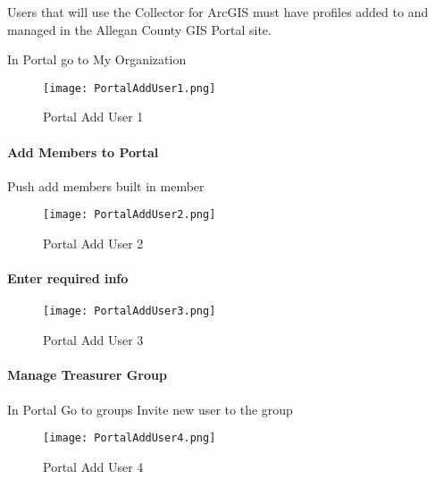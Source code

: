 \noindent Users that will use the Collector for ArcGIS must have profiles added to and managed in the Allegan County GIS Portal site.
\vspace{.5in}

In Portal go to My Organization
\begin{figure}[h!]
\centering
    \texttt{[image: PortalAddUser1.png]}
\caption{Portal Add User 1}
\end{figure}
\clearpage
\paragraph[Add Members to Portal]{\Large Add Members to Portal\texorpdfstring{\\}{}}
\vspace{.5in}

Push add members \rtArrow built in member
\vspace{.5in}

\begin{figure}[h!]
\centering
    \texttt{[image: PortalAddUser2.png]}
\caption{Portal Add User 2}
\end{figure}
\clearpage
\paragraph[Enter required info]{\Large Enter required info\texorpdfstring{\\}{}}
\vspace{.5in}

\begin{figure}[h!]
\centering
    \texttt{[image: PortalAddUser3.png]}
\caption{Portal Add User 3}
\end{figure}
\clearpage
\paragraph[Manage Treasurer Group]{\Large Manage Treasurer Group\texorpdfstring{\\}{}}
\vspace{.5in}

In Portal \rtArrow Go to groups \rtArrow Invite new user to the group
\vspace{.5in}

\begin{figure}[h!]
\centering
    \texttt{[image: PortalAddUser4.png]}
\caption{Portal Add User 4}
\end{figure}
\clearpage
